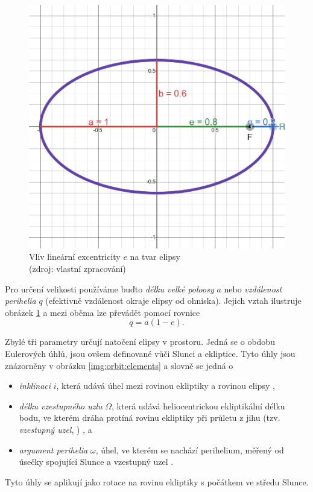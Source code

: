 \begin{figure}[ht]
    \includegraphics[width=0.5\linewidth]{img/ellipse-e08.png}
    \caption[Vliv lineární excentricity $e$ na tvar elipsy]{Vliv lineární excentricity $e$ na tvar elipsy\\{\small (zdroj: vlastní zpracování)}}
    \label{img:orbit:ellipse}
\end{figure}

Pro určení velikosti používáme buďto \textit{délku velké poloosy} $a$ nebo \textit{vzdálenost perihelia} $q$ (efektivně vzdálenost okraje elipsy od ohniska). Jejich vztah ilustruje obrázek \ref{img:orbit:ellipse} a mezi oběma lze převádět pomocí rovnice \cite{ceplecha}
$$
    q=a(1-e)\text{.}
$$

\smallskip

Zbylé tři parametry určují natočení elipsy v prostoru. Jedná se o obdobu Eulerových úhlů, jsou ovšem definované vůči Slunci a ekliptice. Tyto úhly jsou znázorněny v obrázku \ref{img:orbit:elements} a slovně se jedná o
\begin{itemize}
    \item \textit{inklinaci} $i$, která udává úhel mezi rovinou ekliptiky a rovinou elipsy \cite{astro},
    \item \textit{délku vzestupného uzlu} $\Omega$, která udává heliocentrickou ekliptikální délku bodu, ve kterém dráha protíná rovinu ekliptiky při průletu z jihu (tzv. \textit{vzestupný uzel}, \NorthNode) \cite{astro}, a
    \item \textit{argument perihelia} $\omega$, úhel, ve kterém se nachází perihelium, měřený od úsečky spojující Slunce a vzestupný uzel \cite{astro}.
\end{itemize}
Tyto úhly se aplikují jako rotace na rovinu ekliptiky s počátkem ve středu Slunce.

